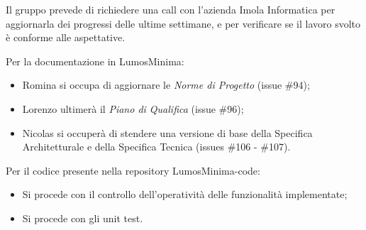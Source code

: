 \documentclass[a4paper, 12pt]{article}
\begin{document}
Il gruppo prevede di richiedere una call con l'azienda Imola Informatica per aggiornarla dei progressi delle ultime settimane, e per verificare se il lavoro svolto è conforme alle aspettative.

Per la documentazione in LumosMinima:
\begin{itemize}
    \item Romina si occupa di aggiornare le \textit{Norme di Progetto} (issue \#94);
    \item Lorenzo ultimerà il \textit{Piano di Qualifica} (issue \#96);
    \item Nicolas si occuperà di stendere una versione di base della Specifica Architetturale e della Specifica Tecnica (issues \#106 - \#107).
\end{itemize}

Per il codice presente nella repository LumosMinima-code:
\begin{itemize}
    \item Si procede con il controllo dell'operatività delle funzionalità implementate;
    \item Si procede con gli unit test.
\end{itemize}
\end{document}
